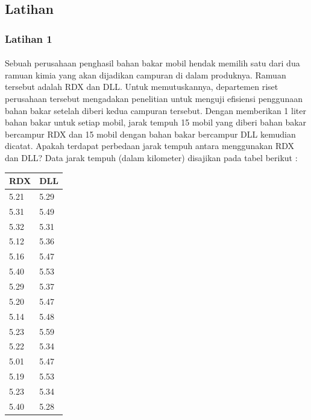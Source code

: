 \documentclass[a4paper,12pt]{article}
\begin{document}
\subsection{Latihan}
\subsubsection{Latihan 1}
\paragraph{}
Sebuah perusahaan penghasil bahan bakar mobil hendak memilih satu dari dua ramuan kimia yang akan dijadikan campuran di dalam produknya. Ramuan tersebut adalah RDX dan DLL. Untuk
memutuskannya, departemen riset perusahaan tersebut mengadakan penelitian untuk menguji efisiensi penggunaan bahan bakar setelah diberi kedua campuran tersebut. Dengan memberikan 1 liter bahan
bakar untuk setiap mobil, jarak tempuh 15 mobil yang diberi bahan bakar bercampur RDX dan 15 mobil dengan bahan bakar bercampur DLL kemudian dicatat. Apakah terdapat perbedaan jarak tempuh
antara menggunakan RDX dan DLL? Data jarak tempuh (dalam kilometer) disajikan pada tabel berikut :
\begin{table}[!ht]
    \centering
\begin{tabular}{|l|l|}
\hline
RDX  & DLL  \\ \hline
5.21 & 5.29 \\ \hline
5.31 & 5.49 \\ \hline
5.32 & 5.31 \\ \hline
5.12 & 5.36 \\ \hline
5.16 & 5.47 \\ \hline
5.40 & 5.53 \\ \hline
5.29 & 5.37 \\ \hline
5.20 & 5.47 \\ \hline
5.14 & 5.48 \\ \hline
5.23 & 5.59 \\ \hline
5.22 & 5.34 \\ \hline
5.01 & 5.47 \\ \hline
5.19 & 5.53 \\ \hline
5.23 & 5.34 \\ \hline
5.40 & 5.28 \\ \hline
\end{tabular}
\end{table}
\end{document}
